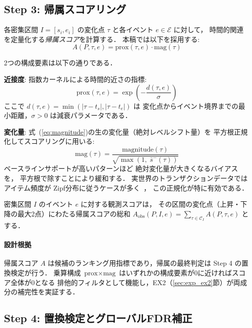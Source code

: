 \subsection{Step 3: 帰属スコアリング}

各密集区間 $I = [s_i, e_i]$ の変化点 $\tau$ と各イベント $e \in \mathcal{E}$ に対して，
時間的関連を定量化する\emph{帰属スコア}を計算する．
本稿では以下を採用する:
\begin{equation}
A(P, \tau, e) = \text{prox}(\tau, e) \cdot \text{mag}(\tau)
\label{eq:attribution_score}
\end{equation}

2つの構成要素は以下の通りである．

\textbf{近接度}: 指数カーネルによる時間的近さの指標:
\begin{equation}
\text{prox}(\tau, e) = \exp\left(-\frac{d(\tau, e)}{\sigma}\right)
\label{eq:proximity}
\end{equation}
ここで $d(\tau, e) = \min(|\tau - t_s|, |\tau - t_e|)$ は
変化点からイベント境界までの最小距離，$\sigma > 0$ は減衰パラメータである．

\textbf{変化量}: 式~(\ref{eq:magnitude})の生の変化量（絶対レベルシフト量）を
平方根正規化してスコアリングに用いる:
\begin{equation}
\text{mag}(\tau) = \frac{\text{magnitude}(\tau)}{\sqrt{\max(1,\; \bar{s}^{-}(\tau))}}
\label{eq:mag_sqrt}
\end{equation}
ベースラインサポートが高いパターンほど
絶対変化量が大きくなるバイアスを，
平方根で除すことにより緩和する．
実世界のトランザクションデータではアイテム頻度が
Zipf分布に従うケースが多く~\cite{fournier2017survey}，
この正規化が特に有効である．

密集区間 $I$ のイベント $e$ に対する観測スコアは，
その区間の変化点（上昇・下降の最大2点）にわたる帰属スコアの総和
$A_{\text{obs}}(P, I, e) = \sum_{\tau \in \mathcal{C}_I} A(P, \tau, e)$ とする．

\paragraph{設計根拠}
帰属スコア $A$ は候補のランキング用指標であり，帰属の最終判定は Step 4 の置換検定が行う．
乗算構成 $\text{prox} \times \text{mag}$ はいずれかの構成要素が0に近ければスコア全体が0となる
排他的フィルタとして機能し，EX2（\ref{sec:exp_ex2}節）が両成分の補完性を実証する．

\subsection{Step 4: 置換検定とグローバルFDR補正}

